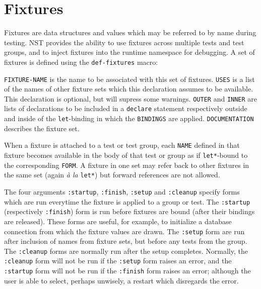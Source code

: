 \section{Fixtures}
\label{fixtures}
Fixtures are data structures and values which may be
referred to by name during testing.  NST provides the ability to use
fixtures across multiple tests and test groups, and to inject fixtures
into the runtime namespace for debugging.
A set of fixtures is defined using the \texttt{def-fixtures}
macro:

%
\texttt{FIXTURE-NAME} is the name to be associated with this set of
fixtures.  \texttt{USES} is a list of the names of other fixture sets
which this declaration assumes to be available.  This declaration is
optional, but will supress some warnings.  \texttt{OUTER} and
\texttt{INNER} are lists of declarations to be included in a
\texttt{declare} statement respectively outside and inside of the
\texttt{let}-binding in which the \texttt{BINDINGS} are applied.
\texttt{DOCUMENTATION} describes the fixture set.

When a fixture is attached to a test or test group, each \texttt{NAME}
defined in that fixture becomes available in the body of that test or
group as if \texttt{let*}-bound to the corresponding \texttt{FORM}.  A
fixture in one set may refer back to other fixtures in the same set
(again \emph{\`a la} \texttt{let*}) but forward references are not
allowed.

The four arguments \texttt{:startup},
\texttt{:finish},
\texttt{:setup} and
\texttt{:cleanup} specify forms which
are run everytime the fixture is applied to a group or test.  The
\texttt{:startup} (respectively \texttt{:finish}) form is run before
fixtures are bound (after their bindings are released).  These forms
are useful, for example, to initialize a database connection from
which the fixture values are drawn.  The \texttt{:setup} form are run
after inclusion of names from fixture sets, but before any tests from
the group.  The \texttt{:cleanup} forms are normally run after the
setup completes.  Normally, the \texttt{:cleanup} form will not be run
if the \texttt{:setup} form raises an error, and the \texttt{:startup}
form will not be run if the \texttt{:finish} form raises an error;
although the user is able to select, perhaps unwisely, a restart which
disregards the error.


